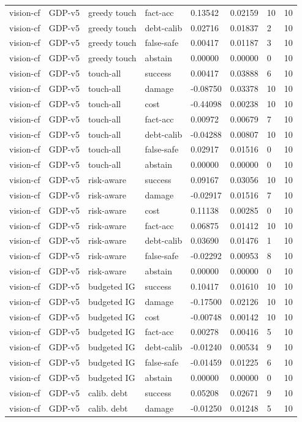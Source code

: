 \documentclass{article}
\begin{document}
\begin{center}
\begin{longtable}{llllllll}
vision-cf & GDP-v5 & greedy touch & fact-acc & 0.13542 & 0.02159 & 10 & 10 \\
vision-cf & GDP-v5 & greedy touch & debt-calib & 0.02716 & 0.01837 & 2 & 10 \\
vision-cf & GDP-v5 & greedy touch & false-safe & 0.00417 & 0.01187 & 3 & 10 \\
vision-cf & GDP-v5 & greedy touch & abstain & 0.00000 & 0.00000 & 0 & 10 \\
vision-cf & GDP-v5 & touch-all & success & 0.00417 & 0.03888 & 6 & 10 \\
vision-cf & GDP-v5 & touch-all & damage & -0.08750 & 0.03378 & 10 & 10 \\
vision-cf & GDP-v5 & touch-all & cost & -0.44098 & 0.00238 & 10 & 10 \\
vision-cf & GDP-v5 & touch-all & fact-acc & 0.00972 & 0.00679 & 7 & 10 \\
vision-cf & GDP-v5 & touch-all & debt-calib & -0.04288 & 0.00807 & 10 & 10 \\
vision-cf & GDP-v5 & touch-all & false-safe & 0.02917 & 0.01516 & 0 & 10 \\
vision-cf & GDP-v5 & touch-all & abstain & 0.00000 & 0.00000 & 0 & 10 \\
vision-cf & GDP-v5 & risk-aware & success & 0.09167 & 0.03056 & 10 & 10 \\
vision-cf & GDP-v5 & risk-aware & damage & -0.02917 & 0.01516 & 7 & 10 \\
vision-cf & GDP-v5 & risk-aware & cost & 0.11138 & 0.00285 & 0 & 10 \\
vision-cf & GDP-v5 & risk-aware & fact-acc & 0.06875 & 0.01412 & 10 & 10 \\
vision-cf & GDP-v5 & risk-aware & debt-calib & 0.03690 & 0.01476 & 1 & 10 \\
vision-cf & GDP-v5 & risk-aware & false-safe & -0.02292 & 0.00953 & 8 & 10 \\
vision-cf & GDP-v5 & risk-aware & abstain & 0.00000 & 0.00000 & 0 & 10 \\
vision-cf & GDP-v5 & budgeted IG & success & 0.10417 & 0.01610 & 10 & 10 \\
vision-cf & GDP-v5 & budgeted IG & damage & -0.17500 & 0.02126 & 10 & 10 \\
vision-cf & GDP-v5 & budgeted IG & cost & -0.00748 & 0.00142 & 10 & 10 \\
vision-cf & GDP-v5 & budgeted IG & fact-acc & 0.00278 & 0.00416 & 5 & 10 \\
vision-cf & GDP-v5 & budgeted IG & debt-calib & -0.01240 & 0.00534 & 9 & 10 \\
vision-cf & GDP-v5 & budgeted IG & false-safe & -0.01459 & 0.01225 & 6 & 10 \\
vision-cf & GDP-v5 & budgeted IG & abstain & 0.00000 & 0.00000 & 0 & 10 \\
vision-cf & GDP-v5 & calib. debt & success & 0.05208 & 0.02671 & 9 & 10 \\
vision-cf & GDP-v5 & calib. debt & damage & -0.01250 & 0.01248 & 5 & 10 \\
\bottomrule
\end{longtable}
\renewcommand{\arraystretch}{1.0}
\end{center}
\end{document}
